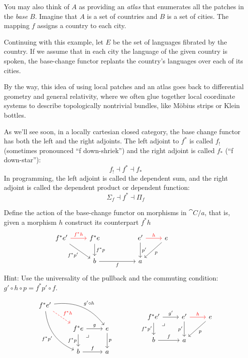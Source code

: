 \documentclass[DaoFP]{subfiles}
\begin{document}
You may also think of $A$ as providing an \emph{atlas} that enumerates all the patches in the \emph{base} $B$. Imagine that $A$ is a set of countries and $B$ is a set of cities. The mapping $f$ assigns a country to each city.

Continuing with this example, let $E$ be the set of languages fibrated by the country. If we assume that in each city the language of the given country is spoken, the base-change functor replants the country's languages over each of its cities.

By the way, this idea of using local patches and an atlas goes back to differential geometry and general relativity, where we often glue together local coordinate systems to describe topologically nontrivial bundles, like M\"{o}bius strips or Klein bottles.

As we'll see soon, in a locally cartesian closed category, the base change functor has both the left and the right adjoints. The left adjoint to $f^*$ is called $f_!$ (sometimes pronounced ``f down-shriek'') and the right adjoint is called $f_*$ (``f down-star''):
\[ f_! \dashv f^* \dashv f_* \]
In programming, the left adjoint is called the dependent sum, and the right adjoint is called the dependent product or dependent function:
\[ \Sigma_f \dashv f^* \dashv \Pi_f \]

\begin{exercise}
Define the action of the base-change functor on morphisms in $\cat C/a$, that is, given a morphism $h$ construct its counterpart $f^* h$
\[
 \begin{tikzcd}
f^* e'
 \arrow[dr, "f^*p'"']
 \arrow[r, red, "f^* h"]
 & f^* e
\arrow[d, "f^*p"]
&& e'
\arrow[d, "p'"]
\arrow[r, red, "h"]
& e
\arrow[dl, "p"]
 \\
& b
\arrow[rr, "f"']
 &&a
\end{tikzcd}
\hspace{40pt}
\begin{tikzcd}
\end{tikzcd}
\]
Hint: Use the universality of the pullback and the commuting condition: $g' \circ h \circ p = f^* p' \circ f$.

\[
\begin{tikzcd}
 f^* e'
 \arrow[dr, dashed, red, "f^* h"]
 \arrow[drr, bend left, "g' \circ h"]
 \arrow[ddr, bend right, "f^* p'"']
 \\
 &f^* e
 \arrow[r, "g"]
 \arrow[d, "f^* p"']
\arrow[dr, phantom,  , very near start, "\lrcorner"]
 &e
 \arrow[d, "p"]
 \\
 &b
 \arrow[r, "f"]
 &a
\end{tikzcd}
\hspace{40pt}
\begin{tikzcd}
f^* e'
\arrow[r, "g'"]
\arrow[d, "f^* p'"']
\arrow[dr, phantom,  , very near start, "\lrcorner"]
& e'
\arrow[d, "p'"']
\arrow[r, red, "h"]
& e
\arrow[dl, "p"]
\\
b
\arrow[r, "f"]
& a
\end{tikzcd}
\]


\end{exercise}
\end{document}
